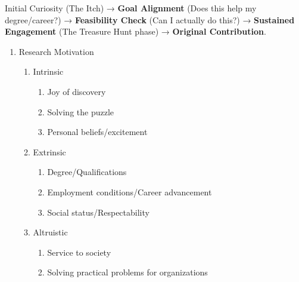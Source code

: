 \documentclass{report}
\begin{document}
\begin{flownotes}
    Initial Curiosity (The Itch) → \textbf{Goal Alignment} (Does this help my degree/career?) → \textbf{Feasibility Check} (Can I actually do this?) → \textbf{Sustained Engagement} (The Treasure Hunt phase) → \textbf{Original Contribution}.
\end{flownotes}

\begin{mindmaps}
    \begin{enumerate}
        \item Research Motivation
        \begin{enumerate}
            \item Intrinsic
            \begin{enumerate}
                \item Joy of discovery
                \item Solving the puzzle
                \item Personal beliefs/excitement
            \end{enumerate}
            \item Extrinsic
            \begin{enumerate}
                \item Degree/Qualifications
                \item Employment conditions/Career advancement
                \item Social status/Respectability
            \end{enumerate}
            \item Altruistic
            \begin{enumerate}
                \item Service to society
                \item Solving practical problems for organizations
            \end{enumerate}
        \end{enumerate}
    \end{enumerate}
\end{mindmaps}
\end{document}
